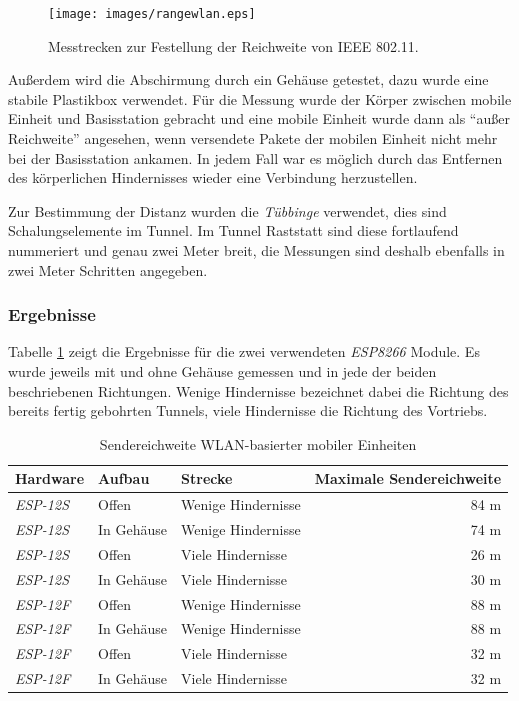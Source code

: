 \begin{figure}[h!]
  \centering
	\texttt{[image: images/rangewlan.eps]}
  \caption{Messtrecken zur Festellung der Reichweite von IEEE 802.11.}
  \label{fig:rangewlan}
\end{figure}

Außerdem wird die Abschirmung durch ein Gehäuse getestet, dazu wurde eine stabile Plastikbox verwendet.
Für die Messung wurde der Körper zwischen mobile Einheit und Basisstation gebracht und eine mobile Einheit wurde dann als "`außer Reichweite"' angesehen, wenn versendete Pakete der mobilen Einheit nicht mehr bei der Basisstation ankamen.
In jedem Fall war es möglich durch das Entfernen des körperlichen Hindernisses wieder eine Verbindung herzustellen.

Zur Bestimmung der Distanz wurden die \emph{Tübbinge} verwendet, dies sind Schalungselemente im Tunnel.
Im Tunnel Raststatt sind diese fortlaufend nummeriert und genau zwei Meter breit, die Messungen sind deshalb ebenfalls in zwei Meter Schritten angegeben.

\subsubsection{Ergebnisse}
Tabelle \ref{table:rangewifi} zeigt die Ergebnisse für die zwei verwendeten \emph{ESP8266} Module.
Es wurde jeweils mit und ohne Gehäuse gemessen und in jede der beiden beschriebenen Richtungen.
Wenige Hindernisse bezeichnet dabei die Richtung des bereits fertig gebohrten Tunnels, viele Hindernisse die Richtung des Vortriebs.

\begin{table}[h]
	\centering
	\caption{Sendereichweite WLAN-basierter mobiler Einheiten}
	\label{table:rangewifi}
	\begin{tabular}{l|l|l|r}
		Hardware & Aufbau & Strecke & Maximale Sendereichweite \\
		\hline
		\emph{ESP-12S} & Offen & Wenige Hindernisse & 84 m \\
		\emph{ESP-12S} & In Gehäuse & Wenige Hindernisse & 74 m \\
		\emph{ESP-12S} & Offen & Viele Hindernisse & 26 m \\
		\emph{ESP-12S} & In Gehäuse & Viele Hindernisse & 30 m \\
		\hline
		\emph{ESP-12F} & Offen & Wenige Hindernisse & 88 m \\
		\emph{ESP-12F} & In Gehäuse & Wenige Hindernisse & 88 m \\
		\emph{ESP-12F} & Offen & Viele Hindernisse & 32 m \\
		\emph{ESP-12F} & In Gehäuse & Viele Hindernisse & 32 m \\
	\end{tabular}
\end{table}


